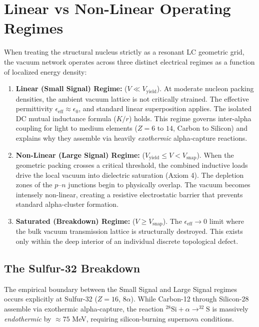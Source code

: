 \section{Linear vs Non-Linear Operating Regimes}
\label{sec:operating_regimes}
When treating the structural nucleus strictly as a resonant LC geometric grid, the vacuum network operates across three distinct electrical regimes as a function of localized energy density:

\begin{enumerate}
    \item \textbf{Linear (Small Signal) Regime:} ($V \ll V_{\text{yield}}$). At moderate nucleon packing densities, the ambient vacuum lattice is not critically strained. The effective permittivity $\epsilon_{\text{eff}} \approx \epsilon_0$, and standard linear superposition applies. The isolated DC mutual inductance formula ($K / r$) holds. This regime governs inter-alpha coupling for light to medium elements ($Z=6$ to $14$, Carbon to Silicon) and explains why they assemble via heavily \textit{exothermic} alpha-capture reactions.
    
    \item \textbf{Non-Linear (Large Signal) Regime:} ($V_{\text{yield}} \le V < V_{\text{snap}}$). When the geometric packing crosses a critical threshold, the combined inductive loads drive the local vacuum into dielectric saturation (Axiom 4). The depletion zones of the $p$--$n$ junctions begin to physically overlap. The vacuum becomes intensely non-linear, creating a resistive electrostatic barrier that prevents standard alpha-cluster formation.
    
    \item \textbf{Saturated (Breakdown) Regime:} ($V \ge V_{\text{snap}}$). The $\epsilon_{\text{eff}} \rightarrow 0$ limit where the bulk vacuum transmission lattice is structurally destroyed. This exists only within the deep interior of an individual discrete topological defect.
\end{enumerate}

\subsection{The Sulfur-32 Breakdown}
The empirical boundary between the Small Signal and Large Signal regimes occurs explicitly at Sulfur-32 ($Z=16$, $8\alpha$). While Carbon-12 through Silicon-28 assemble via exothermic alpha-capture, the reaction $^{28}\text{Si} + \alpha \rightarrow ^{32}\text{S}$ is massively \textit{endothermic} by $\approx 75$ MeV, requiring silicon-burning supernova conditions.

